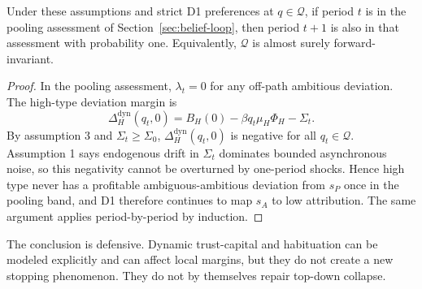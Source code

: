 \begin{theorem}
\label{thm:forward-invariance}
Under these assumptions and strict D1 preferences at $q\in\mathcal Q$, if period $t$ is in the pooling assessment of Section~\ref{sec:belief-loop}, then period $t+1$ is also in that assessment with probability one. Equivalently, $\mathcal Q$ is almost surely forward-invariant.
\end{theorem}

\begin{proof}
In the pooling assessment, $\lambda_t=0$ for any off-path ambitious deviation. The high-type deviation margin is
\[
\Delta_H^{\text{dyn}}(q_t,0)=B_H(0)-\beta q_t\mu_H\Phi_H-\Sigma_t.
\]
By assumption 3 and $\Sigma_t\ge \Sigma_0$, $\Delta_H^{\text{dyn}}(q_t,0)$ is negative for all $q_t\in\mathcal Q$. Assumption 1 says endogenous drift in $\Sigma_t$ dominates bounded asynchronous noise, so this negativity cannot be overturned by one-period shocks.
Hence high type never has a profitable ambiguous-ambitious deviation from $s_P$ once in the pooling band, and D1 therefore continues to map $s_A$ to low attribution. The same argument applies period-by-period by induction.
\end{proof}

The conclusion is defensive. Dynamic trust-capital and habituation can be modeled explicitly and can affect local margins, but they do not create a new stopping phenomenon. They do not by themselves repair top-down collapse.
